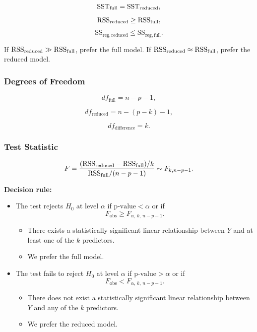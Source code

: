 \begin{keyresult}
\[
\mathrm{SST}_{\text{full}} = \mathrm{SST}_{\text{reduced}},
\]
\[
\mathrm{RSS}_{\text{reduced}} \ge \mathrm{RSS}_{\text{full}},
\]
\[
\mathrm{SS}_{\mathrm{reg,reduced}} \le \mathrm{SS}_{\mathrm{reg,full}}.
\]

If $\mathrm{RSS}_{\text{reduced}} \gg \mathrm{RSS}_{\text{full}}$, prefer the full model.
If $\mathrm{RSS}_{\text{reduced}} \approx \mathrm{RSS}_{\text{full}}$, prefer the reduced model.
\end{keyresult}

\subsubsection{Degrees of Freedom}

\[
df_{\text{full}} = n - p - 1,
\]

\[
df_{\text{reduced}} = n - (p - k) - 1,
\]

\[
df_{\text{difference}} = k.
\]

\subsubsection{Test Statistic}

\begin{keyresult}
\[
F = \frac{(\mathrm{RSS}_{\text{reduced}} - \mathrm{RSS}_{\text{full}})/k}{\mathrm{RSS}_{\text{full}}/(n - p - 1)} \sim F_{k, n-p-1}.
\]
\end{keyresult}

\textbf{Decision rule:}
\begin{itemize}
\item The test rejects $H_0$ at level $\alpha$ if $\text{p-value} < \alpha$ or if
\[
F_{\text{obs}} \geq F_{\alpha,\,k,\,n-p-1}.
\]
\begin{itemize}
\item There exists a statistically significant linear relationship between $Y$ and at least one of the $k$ predictors.
\item We prefer the full model.
\end{itemize}

\item The test fails to reject $H_0$ at level $\alpha$ if $\text{p-value} > \alpha$ or if
\[
F_{\text{obs}} < F_{\alpha,\,k,\,n-p-1}.
\]
\begin{itemize}
\item There does not exist a statistically significant linear relationship between $Y$ and any of the $k$ predictors.
\item We prefer the reduced model.
\end{itemize}
\end{itemize}

